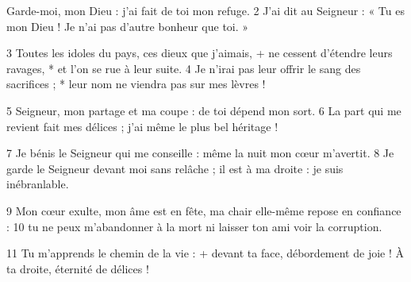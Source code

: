 Garde-moi, mon Dieu :
j'ai fait de toi mon refuge.
2 J'ai dit au Seigneur : « Tu es mon Dieu !
Je n'ai pas d'autre bonheur que toi. »

3 Toutes les idoles du pays,
   ces dieux que j'aimais, +
ne cessent d'étendre leurs ravages, *
et l'on se rue à leur suite.
4 Je n'irai pas leur offrir le sang des sacrifices ; *
leur nom ne viendra pas sur mes lèvres !

5 Seigneur, mon partage et ma coupe :
de toi dépend mon sort.
6 La part qui me revient fait mes délices ;
j'ai même le plus bel héritage !

7 Je bénis le Seigneur qui me conseille :
même la nuit mon cœur m'avertit.
8 Je garde le Seigneur devant moi sans relâche ;
il est à ma droite : je suis inébranlable.

9 Mon cœur exulte, mon âme est en fête,
ma chair elle-même repose en confiance :
10 tu ne peux m'abandonner à la mort
ni laisser ton ami voir la corruption.

11 Tu m'apprends le chemin de la vie : +
devant ta face, débordement de joie !
À ta droite, éternité de délices !